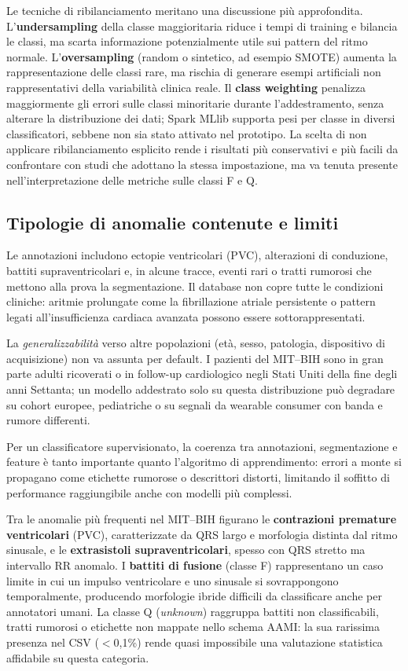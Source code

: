 Le tecniche di ribilanciamento meritano una discussione più approfondita.
L'\textbf{undersampling} della classe maggioritaria riduce i tempi di training e bilancia le classi, ma scarta informazione potenzialmente utile sui pattern del ritmo normale.
L'\textbf{oversampling} (random o sintetico, ad esempio SMOTE) aumenta la rappresentazione delle classi rare, ma rischia di generare esempi artificiali non rappresentativi della variabilità clinica reale.
Il \textbf{class weighting} penalizza maggiormente gli errori sulle classi minoritarie durante l'addestramento, senza alterare la distribuzione dei dati; Spark MLlib supporta pesi per classe in diversi classificatori, sebbene non sia stato attivato nel prototipo.
La scelta di non applicare ribilanciamento esplicito rende i risultati più conservativi e più facili da confrontare con studi che adottano la stessa impostazione, ma va tenuta presente nell'interpretazione delle metriche sulle classi F e Q.

\subsection{Tipologie di anomalie contenute e limiti}\label{subsec:tipologie-di-anomalie}

Le annotazioni includono ectopie ventricolari (PVC), alterazioni di conduzione, battiti supraventricolari e, in alcune tracce, eventi rari o tratti rumorosi che mettono alla prova la segmentazione.
Il database non copre tutte le condizioni cliniche: aritmie prolungate come la fibrillazione atriale persistente o pattern legati all'insufficienza cardiaca avanzata possono essere sottorappresentati.

La \emph{generalizzabilità} verso altre popolazioni (età, sesso, patologia, dispositivo di acquisizione) non va assunta per default.
I pazienti del MIT--BIH sono in gran parte adulti ricoverati o in follow-up cardiologico negli Stati Uniti della fine degli anni Settanta; un modello addestrato solo su questa distribuzione può degradare su cohort europee, pediatriche o su segnali da wearable consumer con banda e rumore differenti.

Per un classificatore supervisionato, la coerenza tra annotazioni, segmentazione e feature è tanto importante quanto l'algoritmo di apprendimento: errori a monte si propagano come etichette rumorose o descrittori distorti, limitando il soffitto di performance raggiungibile anche con modelli più complessi.

Tra le anomalie più frequenti nel MIT--BIH figurano le \textbf{contrazioni premature ventricolari} (PVC), caratterizzate da QRS largo e morfologia distinta dal ritmo sinusale, e le \textbf{extrasistoli supraventricolari}, spesso con QRS stretto ma intervallo RR anomalo.
I \textbf{battiti di fusione} (classe F) rappresentano un caso limite in cui un impulso ventricolare e uno sinusale si sovrappongono temporalmente, producendo morfologie ibride difficili da classificare anche per annotatori umani.
La classe Q (\emph{unknown}) raggruppa battiti non classificabili, tratti rumorosi o etichette non mappate nello schema AAMI: la sua rarissima presenza nel CSV ($<$0{,}1\%) rende quasi impossibile una valutazione statistica affidabile su questa categoria.


